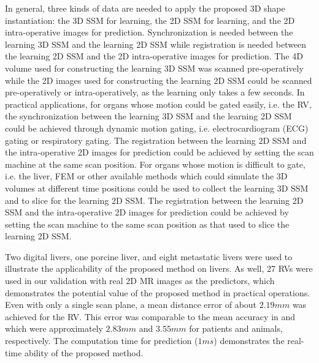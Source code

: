 \documentclass[review]{elsarticle}
\begin{document}
In general, three kinds of data are needed to apply the proposed 3D shape instantiation: the 3D SSM for learning, the 2D SSM for learning, and the 2D intra-operative images for prediction. Synchronization is needed between the learning 3D SSM and the learning 2D SSM while registration is needed between the learning 2D SSM and the 2D intra-operative images for prediction. The 4D volume used for constructing the learning 3D SSM was scanned pre-operatively while the 2D images used for constructing the learning 2D SSM could be scanned pre-operatively or intra-operatively, as the learning only takes a few seconds. In practical applications, for organs whose motion could be gated easily, i.e. the RV, the synchronization between the learning 3D SSM and the learning 2D SSM could be achieved through dynamic motion gating, i.e. electrocardiogram (ECG) gating or respiratory gating. The registration between the learning 2D SSM and the intra-operative 2D images for prediction could be achieved by setting the scan machine at the same scan position. For organs whose motion is difficult to gate, i.e. the liver, FEM or other available methods which could simulate the 3D volumes at different time positions could be used to collect the learning 3D SSM and to slice for the learning 2D SSM. The registration between the learning 2D SSM and the intra-operative 2D images for prediction could be achieved by setting the scan machine to the same scan position as that used to slice the learning 2D SSM. 

Two digital livers, one porcine liver, and eight metastatic livers were used to illustrate the applicability of the proposed method on livers. As well, 27 RVs were used in our validation with real 2D MR images as the predictors, which demonstrates the potential value of the proposed method in practical operations. Even with only a single scan plane, a mean distance error of about $2.19mm$ was achieved for the RV. This error was comparable to the mean accuracy in \citep{gao2012registration} and \citep{huang2009dynamic} which were approximately $2.83mm$ and $3.55mm$ for patients and animals, respectively. The computation time for prediction ($1ms$) demonstrates the real-time ability of the proposed method.
\end{document}
